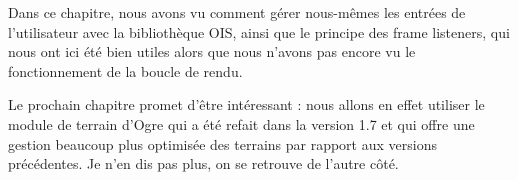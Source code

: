 Dans ce chapitre, nous avons vu comment g\'erer nous-m\^emes les entr\'ees de l'utilisateur avec la biblioth\`eque OIS, ainsi que le principe des frame listeners, qui nous ont ici \'et\'e bien utiles alors que nous n'avons pas encore vu le fonctionnement de la boucle de rendu.

Le prochain chapitre promet d'\^etre int\'eressant : nous allons en effet utiliser le module de terrain d'Ogre qui a \'et\'e refait dans la version 1.7 et qui offre une gestion beaucoup plus optimis\'ee des terrains par rapport aux versions pr\'ec\'edentes. Je n'en dis pas plus, on se retrouve de l'autre c\^ot\'e.

